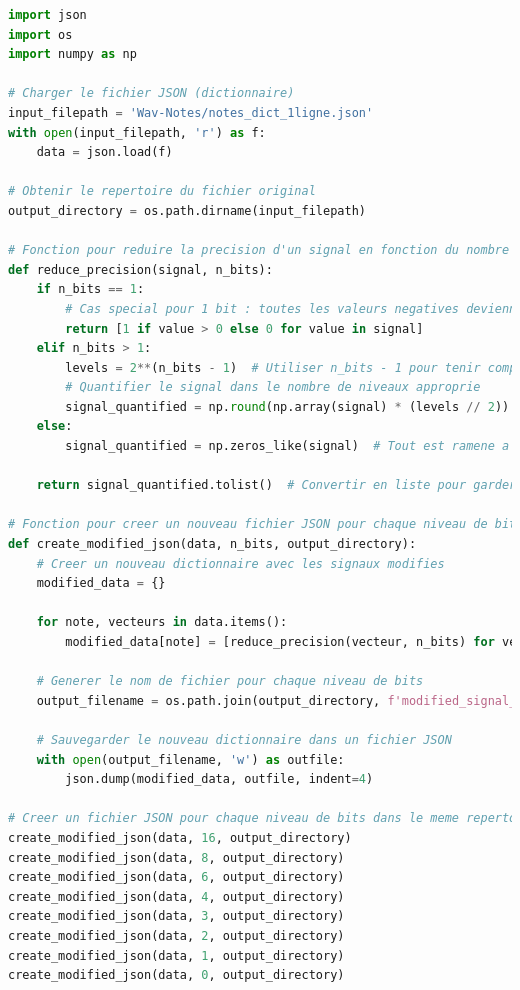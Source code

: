 ﻿\documentclass[11pt,letterpaper]{article}
\begin{document}
\begin{lstlisting}[language=python]
import json
import os
import numpy as np

# Charger le fichier JSON (dictionnaire)
input_filepath = 'Wav-Notes/notes_dict_1ligne.json'
with open(input_filepath, 'r') as f:
    data = json.load(f)

# Obtenir le repertoire du fichier original
output_directory = os.path.dirname(input_filepath)

# Fonction pour reduire la precision d'un signal en fonction du nombre de bits
def reduce_precision(signal, n_bits):
    if n_bits == 1:
        # Cas special pour 1 bit : toutes les valeurs negatives deviennent 0
        return [1 if value > 0 else 0 for value in signal]
    elif n_bits > 1:
        levels = 2**(n_bits - 1)  # Utiliser n_bits - 1 pour tenir compte du bit de signe
        # Quantifier le signal dans le nombre de niveaux approprie
        signal_quantified = np.round(np.array(signal) * (levels // 2)) / (levels // 2)
    else:
        signal_quantified = np.zeros_like(signal)  # Tout est ramene a zero pour 0 bit
    
    return signal_quantified.tolist()  # Convertir en liste pour garder le format JSON

# Fonction pour creer un nouveau fichier JSON pour chaque niveau de bits
def create_modified_json(data, n_bits, output_directory):
    # Creer un nouveau dictionnaire avec les signaux modifies
    modified_data = {}
    
    for note, vecteurs in data.items():
        modified_data[note] = [reduce_precision(vecteur, n_bits) for vecteur in vecteurs]
    
    # Generer le nom de fichier pour chaque niveau de bits
    output_filename = os.path.join(output_directory, f'modified_signal_{n_bits}bit.json')
    
    # Sauvegarder le nouveau dictionnaire dans un fichier JSON
    with open(output_filename, 'w') as outfile:
        json.dump(modified_data, outfile, indent=4)

# Creer un fichier JSON pour chaque niveau de bits dans le meme repertoire que le fichier original
create_modified_json(data, 16, output_directory)
create_modified_json(data, 8, output_directory)
create_modified_json(data, 6, output_directory)
create_modified_json(data, 4, output_directory)
create_modified_json(data, 3, output_directory)
create_modified_json(data, 2, output_directory)
create_modified_json(data, 1, output_directory)
create_modified_json(data, 0, output_directory)
\end{lstlisting}
\end{document}
